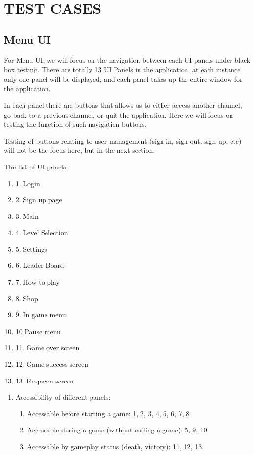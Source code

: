 \documentclass[11pt]{article}
\begin{document}
    \section{TEST CASES}
    
    \subsection{Menu UI}
    For Menu UI, we will focus on the navigation between each UI panels under black box testing. There are totally 13 UI Panels in the application, at each instance only one panel will be displayed, and each panel takes up the entire window for the application.

    In each panel there are buttons that allows us to either access another channel, go back to a previous channel, or quit the application. Here we will focus on testing the function of such navigation buttons. 
    
    Testing of buttons relating to user management (sign in, sign out, sign up, etc) will not be the focus here, but in the next section.
    
    The list of UI panels:
        \begin{enumerate}
            \item 1. Login
            \item 2. Sign up page
            \item 3. Main
            \item 4. Level Selection
            \item 5. Settings
            \item 6. Leader Board
            \item 7. How to play
            \item 8. Shop
            \item 9. In game menu
            \item 10 Pause menu
            \item 11. Game over screen
            \item 12. Game success screen
            \item 13. Respawn screen
        \end{enumerate}    

        \begin{enumerate}
            \item Accessibility of different panels:
            \begin{enumerate}
                \item Accessable before starting a game: 1, 2, 3, 4, 5, 6, 7, 8
                \item Accessable during a game (without ending a game): 5, 9, 10
                \item Accessable by gameplay status (death, victory): 11, 12, 13
            \end{enumerate}
        \end{enumerate}
\end{document}
